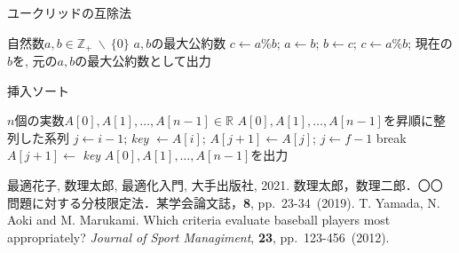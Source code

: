 \documentclass[a4paper,10pt,dvipdfmx]{jsarticle}
\begin{document}
\begin{algorithm}[htbp]
    \caption{ユークリッドの互除法}
    \label{algo1}
    \begin{algorithmic}[1]
    \Require 自然数$a,b \in \mathbb{Z_+} \ \backslash\  \{0\}$
    \Ensure $a,b$の最大公約数
    \State $c \leftarrow a\%b$; 
        \State  $a \leftarrow b$;
        \State  $b \leftarrow c$;
        \State  $c \leftarrow a\%b$;
    \EndWhile{;}
    \State 現在の$b$を, 元の$a,b$の最大公約数として出力
    \end{algorithmic}
\end{algorithm}


\begin{algorithm}[htbp]
    \caption{挿入ソート}
    \label{algo2}
    \begin{algorithmic}[1]
    \Require $n$個の実数$A[0],A[1],\dots,A[n-1] \in \mathbb{R}$
    \Ensure $A[0],A[1],\dots,A[n-1]$を昇順に整列した系列
        \State  $j \leftarrow i-1$;
        \State  \textit{key} $ \leftarrow A[i]$;
            \State $A[j+1] \leftarrow A[j]$;
            \State $j \leftarrow f-1$
                \State break
            \EndIf
        \EndWhile{;}
        \State $A[j+1] \leftarrow $ \textit{key}
    \EndFor{;}
    \State $A[0],A[1],\dots,A[n-1]$を出力
    \end{algorithmic}
\end{algorithm}



\begin{thebibliography}{100}
    \bibitem{} 最適花子, 数理太郎, 最適化入門, 大手出版社, 2021. 
    \bibitem{} 数理太郎，数理二郎．〇〇問題に対する分枝限定法．某学会論文誌，\textbf{8}, pp.~23-34~(2019).
    \bibitem{} T. Yamada, N. Aoki and M. Marukami. Which criteria evaluate baseball players most appropriately? \textit{Journal of Sport Managiment}, \textbf{23}, pp.~123-456~(2012).
\end{thebibliography}
\end{document}
